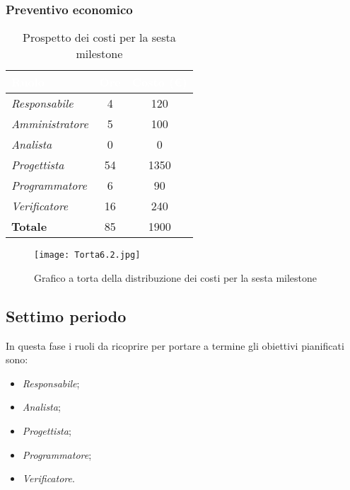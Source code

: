 \newpage
\subsubsection{Preventivo economico}

\begin{table}[H]
    \renewcommand\arraystretch{1.5}
    \centering
    \begin{tabular}{|l|c|c|}
    \hline
    \rowcolor[HTML]{036400}
    \textcolor{white}{\textbf{Ruolo}} & \multicolumn{1}{l|}{\textcolor{white}{\textbf{Ore}}} & \multicolumn{1}{l|}{\textcolor{white}{\textbf{Costo (€)}}} \\ \hline
    \rowcolor[HTML]{EFEFEF}\textit{Responsabile}   & 4    & 120     \\ \hline
    \rowcolor[HTML]{C0C0C0}\textit{Amministratore} & 5  & 100     \\ \hline
    \rowcolor[HTML]{EFEFEF}\textit{Analista}       & 0    & 0     \\ \hline
    \rowcolor[HTML]{C0C0C0}\textit{Progettista}    & 54 & 1350  \\ \hline
    \rowcolor[HTML]{EFEFEF}\textit{Programmatore}  & 6 & 90  \\ \hline
    \rowcolor[HTML]{C0C0C0}\textit{Verificatore}   & 16 & 240  \\ \hline
    \rowcolor[HTML]{EFEFEF}\textbf{Totale}         & 85   & 1900  \\ \hline
    \end{tabular}
    \caption{Prospetto dei costi per la sesta milestone}
\end{table}

\begin{figure}[H]
    \texttt{[image: Torta6.2.jpg]}
    \caption{Grafico a torta della distribuzione dei costi per la sesta milestone}
\end{figure}

\subsection{Settimo periodo}

In questa fase i ruoli da ricoprire per portare a termine gli obiettivi pianificati sono:
\begin{itemize}
    \item \textit{Responsabile};
    \item \textit{Analista};
    \item \textit{Progettista};
    \item \textit{Programmatore};
    \item \textit{Verificatore}.
\end{itemize}

